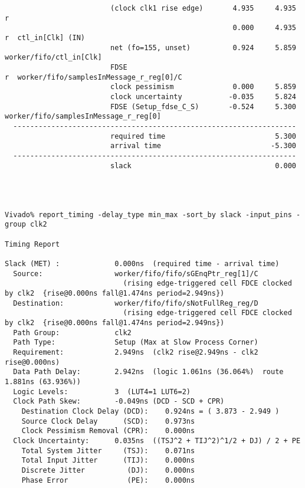 \documentclass{article}
\begin{document}
\begin{lstlisting}
                         (clock clk1 rise edge)       4.935     4.935 r  
                                                      0.000     4.935 r  ctl_in[Clk] (IN)
                         net (fo=155, unset)          0.924     5.859    worker/fifo/ctl_in[Clk]
                         FDSE                                         r  worker/fifo/samplesInMessage_r_reg[0]/C
                         clock pessimism              0.000     5.859    
                         clock uncertainty           -0.035     5.824    
                         FDSE (Setup_fdse_C_S)       -0.524     5.300    worker/fifo/samplesInMessage_r_reg[0]
  -------------------------------------------------------------------
                         required time                          5.300    
                         arrival time                          -5.300    
  -------------------------------------------------------------------
                         slack                                  0.000    




Vivado% report_timing -delay_type min_max -sort_by slack -input_pins -group clk2

Timing Report

Slack (MET) :             0.000ns  (required time - arrival time)
  Source:                 worker/fifo/fifo/sGEnqPtr_reg[1]/C
                            (rising edge-triggered cell FDCE clocked by clk2  {rise@0.000ns fall@1.474ns period=2.949ns})
  Destination:            worker/fifo/fifo/sNotFullReg_reg/D
                            (rising edge-triggered cell FDCE clocked by clk2  {rise@0.000ns fall@1.474ns period=2.949ns})
  Path Group:             clk2
  Path Type:              Setup (Max at Slow Process Corner)
  Requirement:            2.949ns  (clk2 rise@2.949ns - clk2 rise@0.000ns)
  Data Path Delay:        2.942ns  (logic 1.061ns (36.064%)  route 1.881ns (63.936%))
  Logic Levels:           3  (LUT4=1 LUT6=2)
  Clock Path Skew:        -0.049ns (DCD - SCD + CPR)
    Destination Clock Delay (DCD):    0.924ns = ( 3.873 - 2.949 ) 
    Source Clock Delay      (SCD):    0.973ns
    Clock Pessimism Removal (CPR):    0.000ns
  Clock Uncertainty:      0.035ns  ((TSJ^2 + TIJ^2)^1/2 + DJ) / 2 + PE
    Total System Jitter     (TSJ):    0.071ns
    Total Input Jitter      (TIJ):    0.000ns
    Discrete Jitter          (DJ):    0.000ns
    Phase Error              (PE):    0.000ns


\end{lstlisting}
\end{document}
